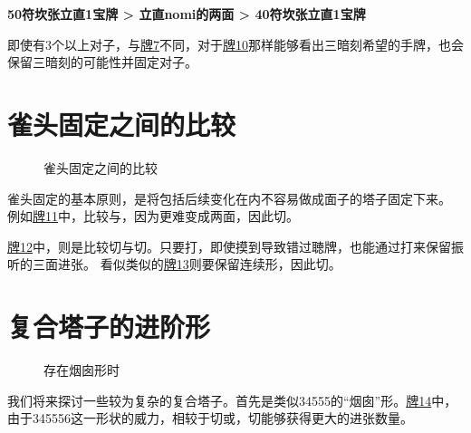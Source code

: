 \par\bigskip
\textbf{50符坎张立直1宝牌 > 立直nomi的两面 > 40符坎张立直1宝牌}
\par\bigskip

即使有3个以上对子，与\hyperref[lec7:pai5-7]{牌7}不同，对于\hyperref[lec7:pai8-10]{牌10}那样能够看出三暗刻希望的手牌，也会保留三暗刻的可能性并固定对子。

\section{雀头固定之间的比较}
\begin{figure}[h]
    \caption{雀头固定之间的比较}
    \label{lec7:pai11-13}
    \par\bigskip
    \par\bigskip
\end{figure}

雀头固定的基本原则，是将包括后续变化在内不容易做成面子的塔子固定下来。
例如\hyperref[lec7:pai11-13]{牌11}中，比较与，因为更难变成两面，因此切。

\hyperref[lec7:pai11-13]{牌12}中，则是比较切与切。只要打，即使摸到导致错过聴牌，也能通过打来保留振听的三面进张。
看似类似的\hyperref[lec7:pai11-13]{牌13}则要保留连续形，因此切。

\section{复合塔子的进阶形}
\begin{figure}[h]
    \caption{存在烟囱形时}
    \label{lec7:pai14-16}
    \par\bigskip
    \par\bigskip
\end{figure}

我们将来探讨一些较为复杂的复合塔子。首先是类似34555的“烟囱”形。\hyperref[lec7:pai14-16]{牌14}中，由于345556这一形状的威力，相较于切或，切能够获得更大的进张数量。

